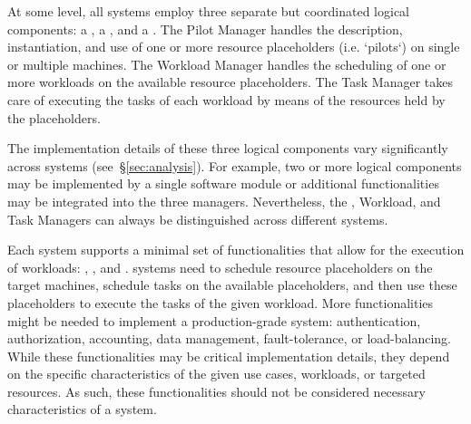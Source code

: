 \documentclass{sig-alternate}
\begin{document}
At some level, all \pilotjob systems employ three separate but coordinated
logical components: a , a , and a
. The Pilot Manager handles the description, instantiation,
and use of one or more resource placeholders (i.e. `pilots`) on single or
multiple machines. The Workload Manager handles the scheduling of one or more
workloads on the available resource placeholders. The Task Manager takes care of
executing the tasks of each workload by means of the resources held by the
placeholders.

The implementation details of these three logical components vary significantly
across \pilotjob systems (see~\S\ref{sec:analysis}). For example, two or more
logical components may be implemented by a single software module or additional
functionalities may be integrated into the three managers. Nevertheless, the
\pilot, Workload, and Task Managers can always be distinguished across different
\pilotjob systems.



Each \pilotjob system supports a minimal set of functionalities that allow for
the execution of workloads: , , and . \pilotjob systems need to schedule
resource placeholders on the target machines, schedule tasks on the available
placeholders, and then use these placeholders to execute the tasks of the given
workload. More functionalities might be needed to implement a production-grade
\pilotjob system: authentication, authorization, accounting, data management,
fault-tolerance, or load-balancing. While these functionalities may be critical
implementation details, they depend on the specific characteristics of the given
use cases, workloads, or targeted resources. As such, these functionalities
should not be considered necessary characteristics of a \pilotjob system.
\end{document}
